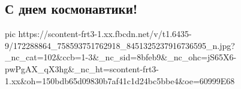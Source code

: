  
 
 
 
 
\subsection{С днем космонавтики!}
\label{sec:12_04_2021.fb.groznyj_valerij.1.k_jebenjam_den_kosmonavtiki}


\ifcmt
  pic https://scontent-frt3-1.xx.fbcdn.net/v/t1.6435-9/172288864_758593751762918_8451325237916736595_n.jpg?_nc_cat=102&ccb=1-3&_nc_sid=8bfeb9&_nc_ohc=jS65X6-pwPgAX_qX3hg&_nc_ht=scontent-frt3-1.xx&oh=150bdb65d09830b7af41c1d24bc5bbe4&oe=60999E68
\fi

